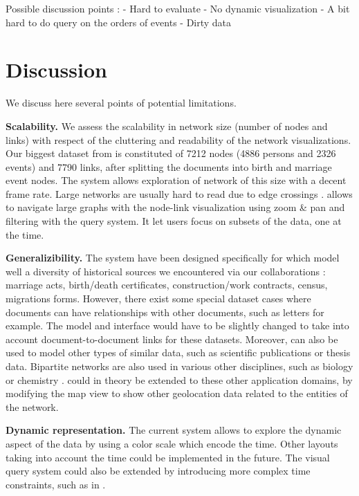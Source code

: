 Possible discussion points :
- Hard to evaluate
- No dynamic visualization
- A bit hard to do query on the orders of events
- Dirty data

\fi


\section{Discussion}

We discuss here several points of potential limitations.

\textbf{Scalability.} We assess the scalability in network size (number of nodes and links) with respect of the cluttering and readability of the network visualizations. Our biggest dataset from \zacarias\xspace is constituted of 7212 nodes (4886 persons and 2326 events) and 7790 links, after splitting the documents into birth and marriage event nodes. The system allows exploration of network of this size with a decent frame rate. Large networks are usually hard to read due to edge crossings \cite{shneiderman2006network}. \name allows to navigate large graphs with the node-link visualization using zoom \& pan and filtering with the query system. It let users focus on subsets of the data, one at the time.

\textbf{Generalizibility.} The system have been designed specifically for \model which model well a diversity of historical sources we encountered via our collaborations : marriage acts, birth/death certificates, construction/work contracts, census, migrations forms. However, there exist some special dataset cases where documents can have relationships with other documents, such as letters for example. The model and interface would have to be slightly changed to take into account document-to-document links for these datasets.
Moreover, \model can also be used to model other types of similar data, such as scientific publications or thesis data.
Bipartite networks are also used in various other disciplines, such as biology \cite{klamt2009hypergraphs} or chemistry \cite{konstantinova2001application}. \name could in theory be extended to these other application domains, by modifying the map view to show other geolocation data related to the entities of the network.

\textbf{Dynamic representation.} The current system allows to explore the dynamic aspect of the data by using a color scale which encode the time. Other layouts taking into account the time could be implemented in the future. The visual query system could also be extended by introducing more complex time constraints, such as in \cite{monroe2012exploring}.

